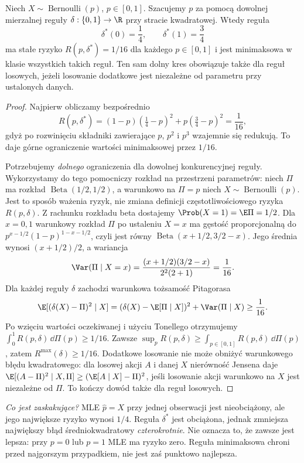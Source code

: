 \begin{twierdzenie}
\label{thm:minimax-bernoulli-one}
Niech $X\sim\operatorname{Bernoulli}(p)$, $p\in[0,1]$.
Szacujemy $p$ za pomocą dowolnej mierzalnej reguły
$\delta:\{0,1\}\to\R$ przy stracie kwadratowej.
Wtedy reguła
\[
\delta^*(0)=\frac14,\qquad \delta^*(1)=\frac34
\]
ma stałe ryzyko $R(p,\delta^*)=1/16$ dla każdego $p\in[0,1]$
i jest minimaksowa w klasie wszystkich takich reguł.
Ten sam dolny kres obowiązuje także dla reguł losowych, jeżeli
losowanie dodatkowe jest niezależne od parametru przy ustalonych danych.
\end{twierdzenie}
\begin{proof}
Najpierw obliczamy bezpośrednio
\[
R(p,\delta^*)=(1-p)(\tfrac14-p)^2+p(\tfrac34-p)^2
=\frac1{16},
\]
gdyż po rozwinięciu składniki zawierające $p$, $p^2$ i $p^3$
wzajemnie się redukują. To daje górne ograniczenie wartości
minimaksowej przez $1/16$.

Potrzebujemy \emph{dolnego} ograniczenia dla dowolnej konkurencyjnej
reguły. Wykorzystamy do tego pomocniczy rozkład na przestrzeni
parametrów: niech $\Pi$ ma rozkład
$\operatorname{Beta}(1/2,1/2)$, a warunkowo na $\Pi=p$ niech
$X\sim\operatorname{Bernoulli}(p)$. Jest to sposób ważenia ryzyk,
nie zmiana definicji częstotliwościowego ryzyka $R(p,\delta)$.
Z rachunku rozkładu beta dostajemy $\Prob(X=1)=\E\Pi=1/2$.
Dla $x=0,1$ warunkowy rozkład $\Pi$ po ustaleniu $X=x$ ma gęstość
proporcjonalną do
$p^{x-1/2}(1-p)^{1-x-1/2}$, czyli jest równy
$\operatorname{Beta}(x+1/2,3/2-x)$.
Jego średnia wynosi $(x+1/2)/2$, a wariancja
\[
\Var(\Pi\mid X=x)
=\frac{(x+1/2)(3/2-x)}{2^2(2+1)}
=\frac1{16}.
\]
Dla każdej reguły $\delta$ zachodzi warunkowa tożsamość Pitagorasa
\[
\E[(\delta(X)-\Pi)^2\mid X]
=(\delta(X)-\E[\Pi\mid X])^2+\Var(\Pi\mid X)
\ge\frac1{16}.
\]
Po wzięciu wartości oczekiwanej i użyciu Tonellego otrzymujemy
$\int_0^1R(p,\delta)\,\dd\Pi(p)\ge1/16$.
Zawsze
$\sup_pR(p,\delta)\ge\int_{p\in[0,1]}R(p,\delta)\,\dd\Pi(p)$,
zatem $R^{\max}(\delta)\ge1/16$.
Dodatkowe losowanie nie może obniżyć warunkowego błędu kwadratowego:
dla losowej akcji $A$ i danej $X$ nierówność Jensena daje
$\E[(A-\Pi)^2\mid X,\Pi]\ge(\E[A\mid X]-\Pi)^2$,
jeśli losowanie akcji warunkowo na $X$ jest niezależne od $\Pi$.
To kończy dowód także dla reguł losowych.
\end{proof}

\emph{Co jest zaskakujące?} MLE $\widehat p=X$ przy jednej obserwacji
jest nieobciążony, ale jego największe ryzyko wynosi $1/4$.
Reguła $\delta^*$ jest obciążona, jednak zmniejsza największy błąd
średniokwadratowy \emph{czterokrotnie}. Nie oznacza to, że zawsze jest
lepsza: przy $p=0$ lub $p=1$ MLE ma ryzyko zero. Reguła minimaksowa
chroni przed najgorszym przypadkiem, nie jest zaś punktowo najlepsza.

